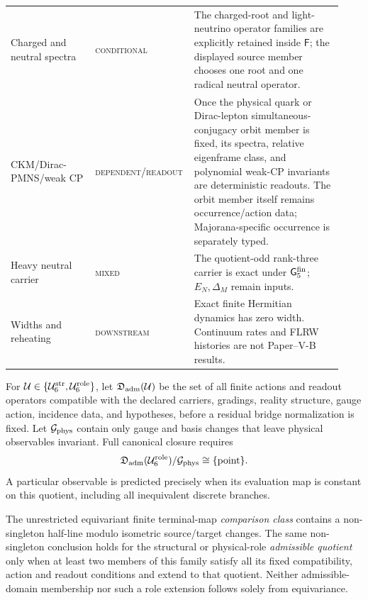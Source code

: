 \documentclass[12pt,a4paper]{article}
\newcommand{\Gfive}{\mathsf G_5^{\rm fin}}
\newcommand{\Ubase}{\mathcal U_6^{\rm str}}
\newcommand{\Urole}{\mathcal U_6^{\rm role}}
\newcommand{\PVIStatus}[1]{\textnormal{\textsc{#1}}}
\begin{document}
\begin{longtable}{@{}>{\raggedright\arraybackslash}p{0.25\linewidth}
                    >{\raggedright\arraybackslash}p{0.24\linewidth}
                    >{\raggedright\arraybackslash}p{0.44\linewidth}@{}}
Charged and neutral spectra
& \PVIStatus{conditional}
& The charged-root and light-neutrino operator families are explicitly
retained inside \(\mathsf F\); the displayed source member chooses one root
and one radical neutral operator. \\
CKM/Dirac-PMNS/weak CP
& \PVIStatus{dependent/readout}
& Once the physical quark or Dirac-lepton simultaneous-conjugacy orbit member
is fixed, its spectra, relative eigenframe class, and polynomial weak-CP
invariants are deterministic readouts.  The orbit member itself remains
occurrence/action data; Majorana-specific occurrence is separately typed. \\
Heavy neutral carrier
& \PVIStatus{mixed}
& The quotient-odd rank-three carrier is exact under \(\Gfive\);
\(E_N,\Delta_M\) remain inputs. \\
Widths and reheating
& \PVIStatus{downstream}
& Exact finite Hermitian dynamics has zero width.  Continuum rates and FLRW
histories are not Paper--V-B results. \\

\end{longtable}
\endgroup

\begin{definition}
\label{p6:def:physical-predictivity}
For \(\mathcal U\in\{\Ubase,\Urole\}\), let
\(\mathfrak D_{\rm adm}(\mathcal U)\) be the set of all finite actions and
readout operators compatible with the declared carriers, gradings, reality
structure, gauge action, incidence data, and hypotheses, before a residual
bridge normalization is fixed.
Let \(\mathcal G_{\rm phys}\) contain only gauge and basis changes that leave
physical observables invariant.  Full canonical closure requires
\begin{equation}
\label{p6:eq:singleton-criterion}
\mathfrak D_{\rm adm}(\Urole)/\mathcal G_{\rm phys}
\cong\{\mathrm{point}\}.
\end{equation}
A particular observable is predicted precisely when its evaluation map is
constant on this quotient, including all inequivalent discrete branches.
\end{definition}

\begin{theorem}
\label{p6:thm:positive-dimensional-obstruction}
The unrestricted equivariant finite terminal-map \emph{comparison class}
contains a non-singleton half-line modulo isometric source/target changes.
The same non-singleton conclusion holds for the structural or physical-role
\emph{admissible quotient} only when at least two members of this family
satisfy all its fixed compatibility, action and readout conditions and extend
to that quotient. Neither admissible-domain membership nor such a role
extension follows solely from equivariance.
\end{theorem}
\end{document}
